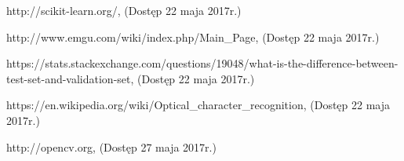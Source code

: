 \documentclass[brudnopis]{xmgr}
\begin{document}
\begin{thebibliography}{9}
  http://scikit-learn.org/, 
  (Dostęp 22 maja 2017r.)  

  http://www.emgu.com/wiki/index.php/Main\_Page, 
  (Dostęp 22 maja 2017r.)
  
  https://stats.stackexchange.com/questions/19048/what-is-the-difference-between-test-set-and-validation-set, 
  (Dostęp 22 maja 2017r.)

  https://en.wikipedia.org/wiki/Optical\_character\_recognition, 
  (Dostęp 22 maja 2017r.)

  http://opencv.org,
  (Dostęp 27 maja 2017r.)

\end{thebibliography}

\oswiadczenie
\end{document}
